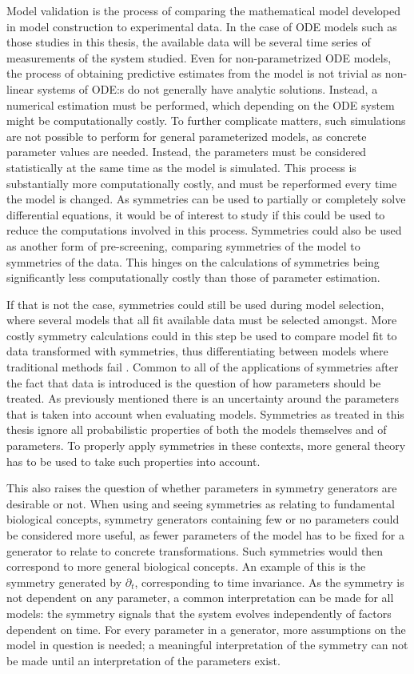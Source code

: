 Model validation is the process of comparing the mathematical model developed in model construction to experimental data.
In the case of ODE models such as those studies in this thesis, the available data will be several time series of measurements of the system studied.
Even for non-parametrized ODE models, the process of obtaining predictive estimates from the model is not trivial as non-linear systems of ODE:s do not generally have analytic solutions.
Instead, a numerical estimation must be performed, which depending on the ODE system might be computationally costly.
To further complicate matters, such simulations are not possible to perform for general parameterized models, as concrete parameter values are needed.
Instead, the parameters must be considered statistically at the same time as the model is simulated.
This process is substantially more computationally costly, and must be reperformed every time the model is changed.
As symmetries can be used to partially or completely solve differential equations, it would be of interest to study if this could be used to reduce the computations involved in this process.
Symmetries could also be used as another form of pre-screening, comparing symmetries of the model to symmetries of the data.
This hinges on the calculations of symmetries being significantly less computationally costly than those of parameter estimation.

If that is not the case, symmetries could still be used during model selection, where several models that all fit available data must be selected amongst.
More costly symmetry calculations could in this step be used to compare model fit to data transformed with symmetries, thus differentiating between models where traditional methods fail \cite{ohlsson2020symmetry}.
Common to all of the applications of symmetries after the fact that data is introduced is the question of how parameters should be treated.
As previously mentioned there is an uncertainty around the parameters that is taken into account when evaluating models.
Symmetries as treated in this thesis ignore all probabilistic properties of both the models themselves and of parameters.
To properly apply symmetries in these contexts, more general theory has to be used to take such properties into account.

This also raises the question of whether parameters in symmetry generators are desirable or not.
When using and seeing symmetries as relating to fundamental biological concepts, symmetry generators containing few or no parameters could be considered more useful, as fewer parameters of the model has to be fixed for a generator to relate to concrete transformations.
Such symmetries would then correspond to more general biological concepts.
An example of this is the symmetry generated by \(\partial_t\), corresponding to time invariance.
As the symmetry is not dependent on any parameter, a common interpretation can be made for all models: the symmetry signals that the system evolves independently of factors dependent on time.
For every parameter in a generator, more assumptions on the model in question is needed; a meaningful interpretation of the symmetry can not be made until an interpretation of the parameters exist.

